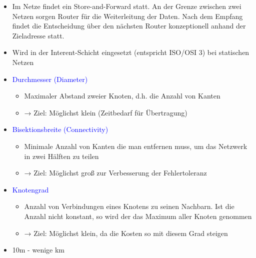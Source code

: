 \begin{itemize}
    \item Im Netze findet ein Store-and-Forward statt. An der Grenze zwischen zwei Netzen sorgen Router für die Weiterleitung der Daten. Nach dem Empfang findet die Entscheidung über den nächsten Router konzeptionell anhand der Zieladresse statt.
    \item Wird in der Interent-Schicht eingesetzt (entspricht ISO/OSI 3) bei statischen Netzen
\end{itemize}

\begin{itemize}
    \item \textcolor{blue}{Durchmesser (Diameter)}
    \begin{itemize}
        \item Maximaler Abstand zweier Knoten, d.h. die Anzahl von Kanten
        \item → Ziel: Möglichst klein (Zeitbedarf für Übertragung)
    \end{itemize}
    \item \textcolor{blue}{Bisektionsbreite (Connectivity)}
    \begin{itemize}
        \item Minimale Anzahl von Kanten die man entfernen muss, um das Netzwerk in zwei Hälften zu teilen
        \item → Ziel: Möglichst groß zur Verbesserung der Fehlertoleranz
    \end{itemize}
    \item \textcolor{blue}{Knotengrad}
    \begin{itemize}
        \item Anzahl von Verbindungen eines Knotens zu seinen Nachbarn. Ist die Anzahl nicht konstant, so wird der das Maximum aller Knoten genommen
        \item → Ziel: Möglichst klein, da die Kosten so mit diesem Grad steigen
    \end{itemize}
\end{itemize}

\begin{itemize}
    \item 10m - wenige km
\end{itemize}

